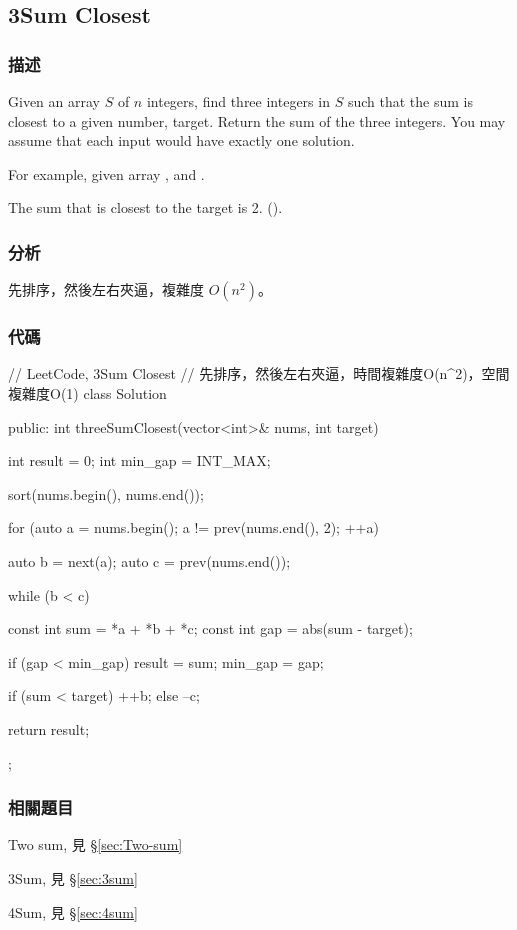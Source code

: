 \subsection{3Sum Closest} %
\label{sec:3sum-closest}


\subsubsection{描述}
Given an array $S$ of $n$ integers, find three integers in $S$ such that the sum is closest to a given number, target. Return the sum of the three integers. You may assume that each input would have exactly one solution.

For example, given array , and .

The sum that is closest to the target is 2. ().


\subsubsection{分析}
先排序，然後左右夾逼，複雜度 $O(n^2)$。


\subsubsection{代碼}
\begin{Code}
// LeetCode, 3Sum Closest
// 先排序，然後左右夾逼，時間複雜度O(n^2)，空間複雜度O(1)
class Solution {
public:
    int threeSumClosest(vector<int>& nums, int target) {
        int result = 0;
        int min_gap = INT_MAX;

        sort(nums.begin(), nums.end());

        for (auto a = nums.begin(); a != prev(nums.end(), 2); ++a) {
            auto b = next(a);
            auto c = prev(nums.end());

            while (b < c) {
                const int sum = *a + *b + *c;
                const int gap = abs(sum - target);

                if (gap < min_gap) {
                    result = sum;
                    min_gap = gap;
                }

                if (sum < target) ++b;
                else              --c;
            }
        }

        return result;
    }
};
\end{Code}


\subsubsection{相關題目}
\begindot
\item Two sum, 見 \S \ref{sec:Two-sum}
\item 3Sum, 見 \S \ref{sec:3sum}
\item 4Sum, 見 \S \ref{sec:4sum}
\myenddot


